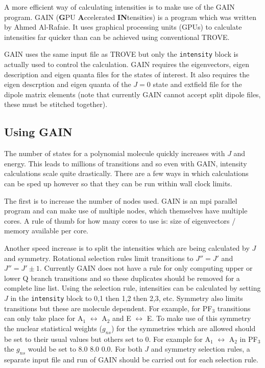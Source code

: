 A more efficient way of calculating intensities is to make use of the GAIN program. GAIN (\textbf{G}PU \textbf{A}ccelerated
\textbf{IN}tensities) is a program which was written by Ahmed Al-Rafaie.\cite{GAIN} 
It uses graphical processing units (GPUs) to calculate intensities far quicker than can be achieved using 
conventional TROVE. 

GAIN uses the same input file as TROVE but only the \verb|intensity| block is actually used to control the calculation. 
GAIN requires the eigenvectors, eigen description and eigen quanta files for the states of interest. It also requires the
eigen descrption and eigen quanta of the $J = 0$ state and extfield file for the dipole matrix elements (note that
currently GAIN cannot accept split dipole files, these must be stitched together). 

\subsection{Using GAIN}

The number of states for a polynomial molecule quickly increases with $J$ and energy. This leads to millions of transitions 
and so even with GAIN, intensity calculations scale quite drastically. There are a few ways in which calculations can be 
sped up however so that they can be run within wall clock limits.

The first is to increase the number of nodes used. GAIN is an mpi parallel program and can make use of multiple nodes,
which themselves have multiple cores. A rule of thumb for how many cores to use is: size of eigenvectors / memory available
per core. 

Another speed increase is to split the intensities which are being calculated by $J$ and symmetry. Rotational selection
rules limit transitions to $J'' = J'$ and $J'' = J' \pm 1$. Currently GAIN does not have a rule for only computing upper or 
lower Q branch transitions and so these duplicates should be removed for a complete line list. 
Using the selection rule, intensities can be calculated by setting
$J$ in the \verb|intensity| block to 0,1 then 1,2 then 2,3, etc. Symmetry also limits transitions but these are molecule
dependent. For example, for PF$_3$ transitions can only take place for A$_1$ $\leftrightarrow$ A$_2$ and 
E $\leftrightarrow$ E. To make use of this symmetry the nuclear statistical weights ($g_{ns}$) for the symmetries which are
allowed should be set to their usual values but others set to 0. For example for A$_1$ $\leftrightarrow$ A$_2$ in PF$_3$ the
$g_{ns}$ would be set to 8.0 8.0 0.0. For both $J$ and symmetry selection rules, a separate input file and run of GAIN
should be carried out for each selection rule.

